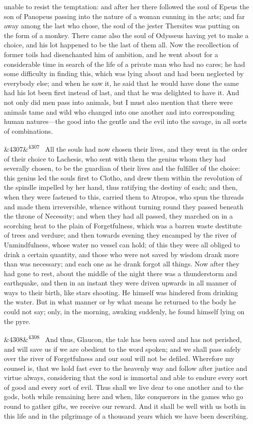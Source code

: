\documentclass[12pt]{article}
\newcommand{\para}[1][]{\par\noindent\ifx&#1&\else\textsuperscript{\footnotesize #1}~\fi}
\begin{document}
unable to resist the temptation: and after her there followed the soul of Epeus the son of Panopeus passing into the nature of a woman cunning in the arts; and far away among the last who chose, the soul of the jester Thersites was putting on the form of a monkey. There came also the soul of Odysseus having yet to make a choice, and his lot happened to be the last of them all. Now the recollection of former toils had disenchanted him of ambition, and he went about for a considerable time in search of the life of a private man who had no cares; he had some difficulty in finding this, which was lying about and had been neglected by everybody else; and when he saw it, he said that he would have done the same had his lot been first instead of last, and that he was delighted to have it. And not only did men pass into animals, but I must also mention that there were animals tame and wild who changed into one another and into corresponding human natures---the good into the gentle and the evil into the savage, in all sorts of combinations.

\para[4307] All the souls had now chosen their lives, and they went in the order of their choice to Lachesis, who sent with them the genius whom they had severally chosen, to be the guardian of their lives and the fulfiller of the choice: this genius led the souls first to Clotho, and drew them within the revolution of the spindle impelled by her hand, thus ratifying the destiny of each; and then, when they were fastened to this, carried them to Atropos, who spun the threads and made them irreversible, whence without turning round they passed beneath the throne of Necessity; and when they had all passed, they marched on in a scorching heat to the plain of Forgetfulness, which was a barren waste destitute of trees and verdure; and then towards evening they encamped by the river of Unmindfulness, whose water no vessel can hold; of this they were all obliged to drink a certain quantity, and those who were not saved by wisdom drank more than was necessary; and each one as he drank forgot all things. Now after they had gone to rest, about the middle of the night there was a thunderstorm and earthquake, and then in an instant they were driven upwards in all manner of ways to their birth, like stars shooting. He himself was hindered from drinking the water. But in what manner or by what means he returned to the body he could not say; only, in the morning, awaking suddenly, he found himself lying on the pyre.

\para[4308] And thus, Glaucon, the tale has been saved and has not perished, and will save us if we are obedient to the word spoken; and we shall pass safely over the river of Forgetfulness and our soul will not be defiled. Wherefore my counsel is, that we hold fast ever to the heavenly way and follow after justice and virtue always, considering that the soul is immortal and able to endure every sort of good and every sort of evil. Thus shall we live dear to one another and to the gods, both while remaining here and when, like conquerors in the games who go round to gather gifts, we receive our reward. And it shall be well with us both in this life and in the pilgrimage of a thousand years which we have been describing.
\end{document}
